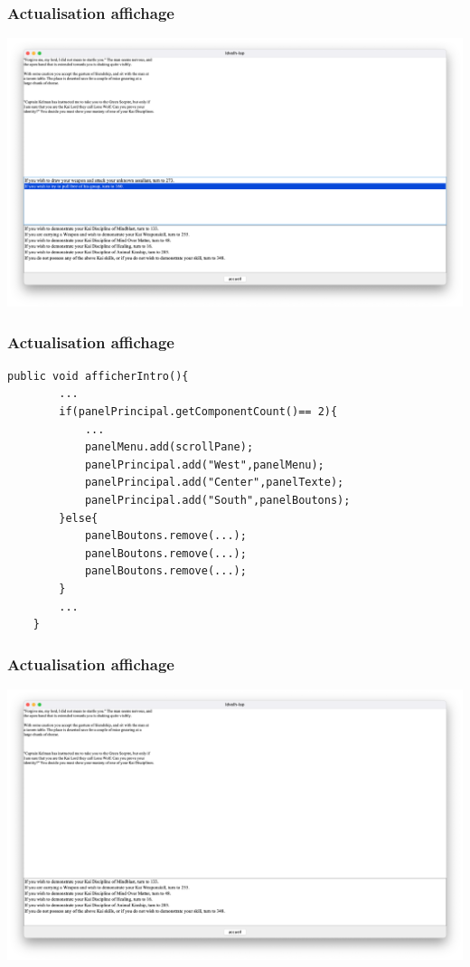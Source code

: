 \documentclass{beamer}
\begin{document}
\begin{frame}
\frametitle{Actualisation affichage}
\includegraphics[scale=0.2]{./images/ChoixBug2.png}
\end{frame}

\begin{frame}[containsverbatim]
\frametitle{Actualisation affichage}
\begin{lstlisting}[tabsize=3,gobble=3]
	public void afficherIntro(){
		...
		if(panelPrincipal.getComponentCount()== 2){
			...
			panelMenu.add(scrollPane);
			panelPrincipal.add("West",panelMenu);
			panelPrincipal.add("Center",panelTexte);
			panelPrincipal.add("South",panelBoutons);
		}else{
			panelBoutons.remove(...);
			panelBoutons.remove(...);
			panelBoutons.remove(...);
		}
		...
	}
\end{lstlisting}
\end{frame}

\begin{frame}
\frametitle{Actualisation affichage}
\includegraphics[scale=0.2]{./images/Choix2SansBug.png}
\end{frame}
\end{document}
